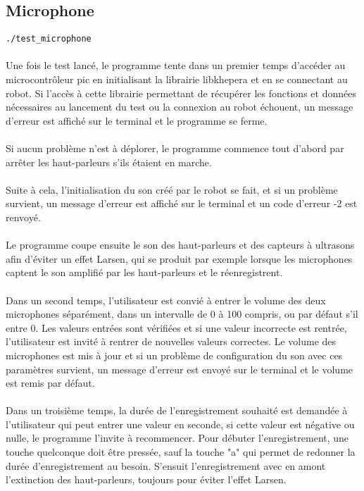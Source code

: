 \documentclass[11pt]{article} %
\begin{document}
\subsection{Microphone}
\verb|./test_microphone|\\
 \\
Une fois le test lancé, le programme tente dans un premier temps d’accéder au microcontrôleur pic en initialisant la librairie libkhepera et en se connectant au robot. Si l’accès à cette librairie permettant de récupérer les fonctions et données nécessaires au lancement du test ou la connexion au robot échouent, un message d’erreur est affiché sur le terminal et le programme se ferme.\\
\\
Si aucun problème n’est à déplorer, le programme commence tout d’abord par arrêter les haut-parleurs s’ils étaient en marche.\\
\\
Suite à cela, l’initialisation du son créé par le robot se fait, et si un problème survient, un message d’erreur est affiché sur le terminal et un code d’erreur -2 est renvoyé.\\
\\
Le programme coupe ensuite le son des haut-parleurs et des capteurs à ultrasons afin d’éviter un effet Larsen, qui se produit par exemple lorsque les	 microphones captent le son amplifié par les haut-parleurs et le réenregistrent.\\
 \\
Dans un second temps, l’utilisateur est convié à entrer le volume des deux microphones séparément, dans un intervalle de 0 à 100 compris, ou par défaut s’il entre 0. Les valeurs entrées sont vérifiées et si une valeur incorrecte est rentrée, l’utilisateur est invité à rentrer de nouvelles valeurs correctes.
Le volume des microphones est mis à jour et si un problème de configuration du son avec ces paramètres survient, un message d’erreur est envoyé sur le terminal et le volume est remis par défaut.\\
 \\
Dans un troisième temps, la durée de l’enregistrement souhaité est demandée à l’utilisateur qui peut entrer une valeur en seconde, si cette valeur est négative ou nulle, le programme l’invite à recommencer. Pour débuter l’enregistrement, une touche quelconque doit être pressée, sauf la touche "a" qui permet de redonner la durée d’enregistrement au besoin. S’ensuit l’enregistrement avec en amont l’extinction des haut-parleurs, toujours pour éviter l’effet Larsen. \\
\end{document}
